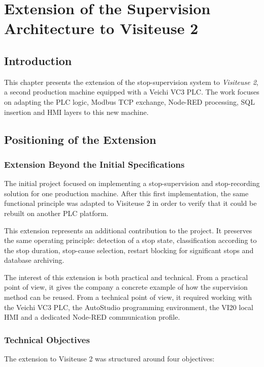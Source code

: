 \chapter{Extension of the Supervision Architecture to Visiteuse 2}

\section*{Introduction}
This chapter presents the extension of the stop-supervision system to \textit{Visiteuse 2}, a second production machine equipped with a Veichi VC3 PLC. The work focuses on adapting the PLC logic, Modbus TCP exchange, Node-RED processing, SQL insertion and HMI layers to this new machine.

\section{Positioning of the Extension}

\subsection{Extension Beyond the Initial Specifications}
The initial project focused on implementing a stop-supervision and stop-recording solution for one production machine. After this first implementation, the same functional principle was adapted to Visiteuse 2 in order to verify that it could be rebuilt on another PLC platform.

This extension represents an additional contribution to the project. It preserves the same operating principle: detection of a stop state, classification according to the stop duration, stop-cause selection, restart blocking for significant stops and database archiving.

The interest of this extension is both practical and technical. From a practical point of view, it gives the company a concrete example of how the supervision method can be reused. From a technical point of view, it required working with the Veichi VC3 PLC, the AutoStudio programming environment, the VI20 local HMI and a dedicated Node-RED communication profile.

\subsection{Technical Objectives}
The extension to Visiteuse 2 was structured around four objectives:

